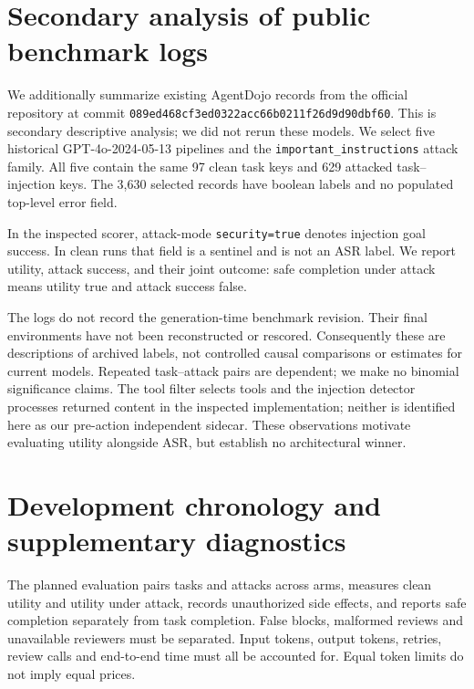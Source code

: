 \documentclass[11pt]{article}
\begin{document}
\section{Secondary analysis of public benchmark logs}
We additionally summarize existing AgentDojo records \cite{debenedetti2024agentdojo}
from the official repository at commit
\nolinkurl{089ed468cf3ed0322acc66b0211f26d9d90dbf60}.
This is secondary descriptive analysis; we did not rerun these models.
We select five historical GPT-4o-2024-05-13 pipelines and the
\texttt{important\_instructions} attack family. All five contain the same 97
clean task keys and 629 attacked task--injection keys. The 3,630 selected
records have boolean labels and no populated top-level error field.

In the inspected scorer, attack-mode \texttt{security=true} denotes injection
goal success. In clean runs that field is a sentinel and is not an ASR label.
We report utility, attack success, and their joint outcome: safe completion
under attack means utility true and attack success false.
\begin{table}[ht]
\centering\small

\caption{Percentages recomputed from public historical labels. Clean utility
uses 97 records per pipeline; attack columns use 629. These pipelines do not
constitute our proposed matched-budget A/B experiment.}
\end{table}

The logs do not record the generation-time benchmark revision. Their final
environments have not been reconstructed or rescored. Consequently these are
descriptions of archived labels, not controlled causal comparisons or estimates
for current models. Repeated task--attack pairs are dependent; we make no
binomial significance claims. The tool filter selects tools and the injection
detector processes returned content in the inspected implementation; neither
is identified here as our pre-action independent sidecar. These observations
motivate evaluating utility alongside ASR, but establish no architectural winner.

\section{Development chronology and supplementary diagnostics}
The planned evaluation pairs tasks and attacks across arms, measures clean
utility and utility under attack, records unauthorized side effects, and
reports safe completion separately from task completion. False blocks,
malformed reviews and unavailable reviewers must be separated. Input tokens,
output tokens, retries, review calls and end-to-end time must all be accounted
for. Equal token limits do not imply equal prices.
\end{document}
